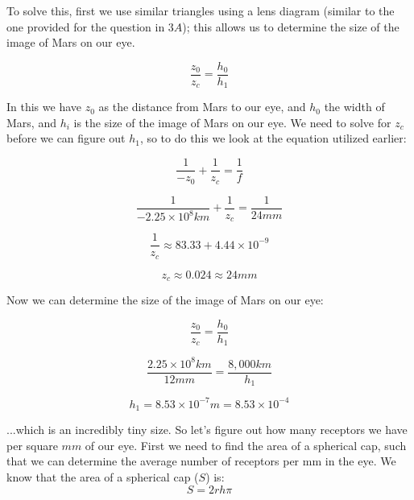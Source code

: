 \documentclass{article}
\begin{document}
To solve this, first we use similar triangles using a lens diagram (similar to the one provided for the question in $3A$); this allows us to determine the size of the image of Mars on our eye.

\begin{equation}
    \frac{z_0}{z_c} = \frac{h_0}{h_1}
\end{equation}

\noindent In this we have $z_0$ as the distance from Mars to our eye, and $h_0$ the width of Mars, and $h_i$ is the size of the image of Mars on our eye. We need to solve for $z_c$ before we can figure out $h_1$, so to do this we look at the equation utilized earlier:

\begin{equation}
    \frac{1}{-z_0}+\frac{1}{z_c}=\frac{1}{f}
\end{equation}

\begin{equation}
    \frac{1}{-2.25\times10^8km}+\frac{1}{z_c}=\frac{1}{24mm}
\end{equation}

\begin{equation}
    \frac{1}{z_c} \approx 83.33 + 4.44\times10^{-9}
\end{equation}

\begin{equation}
    z_c \approx 0.024 \approx 24 mm
\end{equation}

Now we can determine the size of the image of Mars on our eye:

\begin{equation}
    \frac{z_0}{z_c} = \frac{h_0}{h_1}
\end{equation}

\begin{equation}
    \frac{2.25\times10^8km}{12mm} = \frac{8,000km}{h_1}
\end{equation}

\begin{equation}
    h_1 = 8.53\times10^{-7} m = 8.53\times10^{-4}
\end{equation}

\noindent ...which is an incredibly tiny size. So let's figure out how many receptors we have per square $mm$ of our eye. First we need to find the area of a spherical cap, such that we can determine the average number of receptors per mm in the eye. We know that the area of a spherical cap ($S$) is:
\begin{equation}
    S = 2rh\pi
\end{equation}
\end{document}
